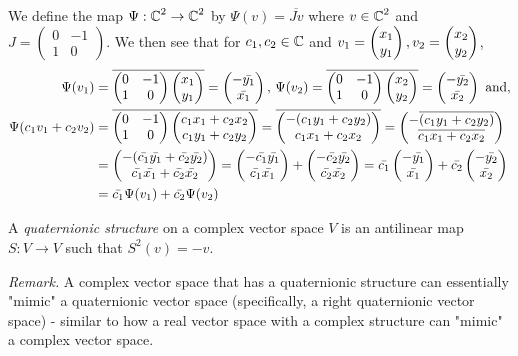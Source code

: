 \begin{ex} \label{ex:antilinear}
	We define the map $\Psi: \operatorname{\mathbb{C}}^2 \rightarrow \operatorname{\mathbb{C}}^2$ by $\Psi(v) = \overline{Jv}$ where $v \in \operatorname{\mathbb{C}}^2$ and $J = 
	\begin{pmatrix}
		0 & -1 \\
		1 & 0
	\end{pmatrix}$.
	We then see that for $c_1,c_2 \in \operatorname{\mathbb{C}}$ and $v_1 = \begin{pmatrix} x_1 \\ y_1 \end{pmatrix}, v_2 = \begin{pmatrix} x_2 \\ y_2 \end{pmatrix}$, 
	\begin{align*}
		\Psi(v_1) &= 
		\overline{
		\begin{pmatrix}
			0 & -1 \\
			1 & 0
		\end{pmatrix}\begin{pmatrix} x_1 \\ y_1 \end{pmatrix}} = \begin{pmatrix} -\bar{y_1} \\ \bar{x_1} \end{pmatrix}\text{, }
		\Psi(v_2) = 
		\overline{
		\begin{pmatrix}
			0 & -1 \\
			1 & 0
		\end{pmatrix}\begin{pmatrix} x_2 \\ y_2 \end{pmatrix}} = \begin{pmatrix} -\bar{y_2} \\ \bar{x_2} \end{pmatrix}\text{ and,}
		\\ 
		\Psi(c_1v_1+c_2v_2) &= 
		\overline{
		\begin{pmatrix}
			0 & -1 \\
			1 & 0
		\end{pmatrix}
		\begin{pmatrix} c_1x_1+c_2x_2 \\ c_1y_1+c_2y_2 \end{pmatrix}
		} = \overline{\begin{pmatrix} -(c_1y_1+c_2y_2) \\ c_1x_1+c_2x_2 \end{pmatrix}} = \begin{pmatrix} -\overline{(c_1y_1+c_2y_2)} \\ \overline{c_1x_1+c_2x_2} \end{pmatrix} \\
		&=\begin{pmatrix} -(\bar{c_1}\bar{y_1}+\bar{c_2}\bar{y_2}) \\ \bar{c_1}\bar{x_1}+\bar{c_2}\bar{x_2} \end{pmatrix} = \begin{pmatrix} -\bar{c_1}\bar{y_1} \\ \bar{c_1}\bar{x_1} \end{pmatrix}+\begin{pmatrix} -\bar{c_2}\bar{y_2} \\ \bar{c_2}\bar{x_2} \end{pmatrix} = \bar{c_1}\begin{pmatrix} -\bar{y_1} \\ \bar{x_1} \end{pmatrix} + \bar{c_2}\begin{pmatrix} -\bar{y_2} \\ \bar{x_2} \end{pmatrix} \\
		&= \bar{c_1}\Psi(v_1)+\bar{c_2}\Psi(v_2)
	\end{align*}
\end{ex}

\begin{definition} \label{def:quatstruct}
	\cite{jwr} A \emph{quaternionic structure} on a complex vector space $V$ is an antilinear map $S: V \rightarrow V$ such that $S^2(v) = -v$.
\end{definition}

\textit{Remark.} A complex vector space that has a quaternionic structure can essentially "mimic" a quaternionic vector space (specifically, a right quaternionic vector space) \cite{jwr} - similar to how a real vector space with a complex structure can "mimic" a complex vector space.

